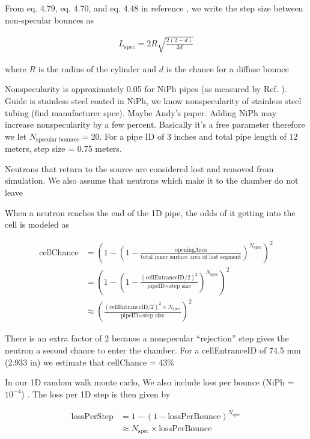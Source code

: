 From eq. 4.79, eq. 4.70, and eq. 4.48 in reference \cite{golubUCN}, we write the step size between non-specular bounces as

\begin{gather}
    L_\text{spec} = 2 R\sqrt{\frac{2(2-d)}{3d} }
\end{gather}


where $R$ is the radius of the cylinder and $d$ is the chance for a diffuse bounce

Nonspecularity is approximately 0.05 for NiPh pipes (as measured by Ref. \cite{pattie_jr_evaluation_2017}). {\color{blue}Guide is stainless steel coated in NiPh, we know nonspecularity of stainless steel tubing (find manufacturer spec). Maybe Andy's paper. Adding NiPh may increase nonspecularity by a few percent. Basically it's a free parameter} therefore we let $N_\text{specular bounces} = 20$. For a pipe ID of 3 inches and total pipe length of 12 meters, step size = 0.75 meters.

Neutrons that return to the source are considered lost and removed from simulation. We also assume that neutrons which make it to the chamber do not leave

When a neutron reaches the end of the 1D pipe, the odds of it getting into the cell is modeled as

\begin{align}
    \text{cellChance} &= \left(1 - \left( 1 - \frac{ \text{openingArea} } {\text{total inner surface area of last segment}} \right) ^ {N_\text{spec}} \right)^2 \\
    &= \left(1 - \left( 1 - \frac{ (\text{cellEntranceID}/2)^{2} } {\text{pipeID}\times\text{step size}} \right) ^ {N_\text{spec}} \right) ^2 \\
    &\approx \left( \frac{ (\text{cellEntranceID}/2)^{2} \times N_\text{spec} } {\text{pipeID}\times\text{step size}} \right)^2
\end{align}

There is an extra factor of 2 because a nonspecular ``rejection'' step gives the neutron a second chance to enter the chamber. For a cellEntranceID of 74.5 mm (2.933 in) we estimate that cellChance = 43\%

In our 1D random walk monte carlo, We also include loss per bounce (NiPh = $10^{-4}$) \cite{pattie_jr_evaluation_2017}. The loss per 1D step is then given by

\begin{align}
    \text{lossPerStep} &= 1 - \left(1 - \text{lossPerBounce} \right)^{N_\text{spec}}\\
    &\approx N_\text{spec} \times \text{lossPerBounce}
\end{align}

